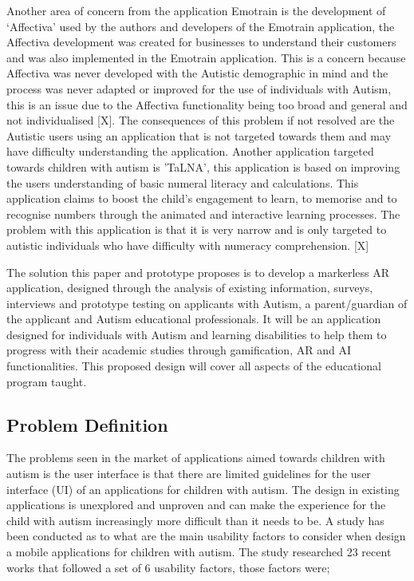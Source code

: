 Another area of concern from the application Emotrain is the development of ‘Affectiva’ used by the authors and developers of the Emotrain application, the Affectiva development was created for businesses to understand their customers and was also implemented in the Emotrain application. This is a concern because Affectiva was never developed with the Autistic demographic in mind and the process was never adapted or improved for the use of individuals with Autism, this is an issue due to the Affectiva functionality being too broad and general and not individualised [X]. The consequences of this problem if not resolved are the Autistic users using an application that is not targeted towards them and may have difficulty understanding the application. Another application targeted towards children with autism is 'TaLNA', this application is based on improving the users understanding of basic numeral literacy and calculations. This application claims to boost the child's engagement to learn, to memorise and to recognise numbers through the animated and interactive learning processes. The problem with this application is that it is very narrow and is only targeted to autistic individuals who have difficulty with numeracy comprehension. [X]


The solution this paper and prototype proposes is to develop a markerless AR application, designed through the analysis of existing information, surveys, interviews and prototype testing on applicants with Autism, a parent/guardian of the applicant and Autism educational professionals. It will be an application designed for individuals with Autism and learning disabilities to help them to progress with their academic studies through gamification, AR and AI functionalities. This proposed design will cover all aspects of the educational program taught.

\subsection{Problem Definition}
The problems seen in the market of applications aimed towards children with autism is the user interface is that there are limited guidelines for the user interface (UI) of an applications for children with autism. The design in existing applications is unexplored and unproven and can make the experience for the child with autism increasingly more difficult than it needs to be. A study has been conducted as to what are the main usability factors to consider when design a mobile applications for children with autism. The study researched 23 recent works that followed a set of 6 usability factors, those factors were;

